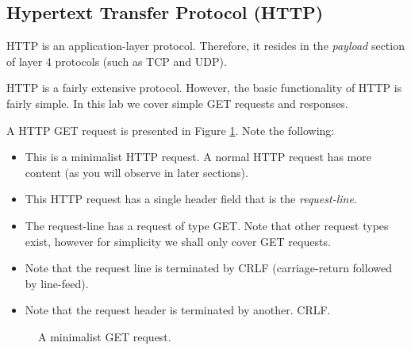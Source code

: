 \documentclass[pdftex,12pt,a4paper]{article}
\begin{document}
        \subsection{Hypertext Transfer Protocol (HTTP)}
            HTTP is an application-layer protocol. Therefore, it resides in the
            \emph{payload} section of layer 4 protocols (such as TCP and UDP).

            HTTP is a fairly extensive protocol. However, the basic
            functionality of HTTP is fairly simple. In this lab we cover simple
            GET requests and responses.

            A HTTP GET request is presented in Figure \ref{fig:getreq}. Note
            the following:
            \begin{itemize}
                \item This is a minimalist HTTP request. A normal HTTP request
                has more content (as you will observe in later sections).
                \item This HTTP request has a single header field that is the
                \emph{request-line}.
                \item The request-line has a request of type GET. Note that
                    other request types exist, however for simplicity we shall
                    only cover GET requests.
                \item Note that the request line is terminated by CRLF
                    (carriage-return followed by line-feed).
                \item Note that the request header is terminated by another.
                    CRLF.
            \end{itemize}
            \begin{figure}[tbh]
                \centering
                
                \caption{A minimalist GET request.}
                \label{fig:getreq}
            \end{figure}
\end{document}
